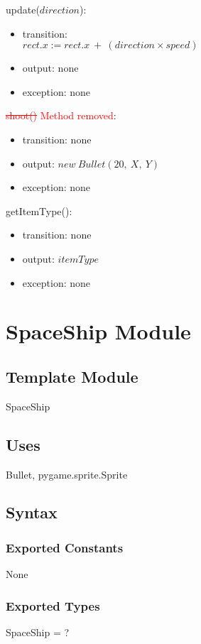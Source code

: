\documentclass[12pt]{article}
\begin{document}
\noindent update($direction$):
\begin{itemize}
\item transition: \\
$rect.x := rect.x\ +\ (direction \times speed)$
\item output: none
\item exception: none
\end{itemize}

\noindent \textcolor{red}{\st{shoot()} Method removed}:
\begin{itemize}
\item transition: none
\item output: $new\ Bullet(20,\ X,\ Y)$
\item exception: none
\end{itemize}

\noindent getItemType():
\begin{itemize}
\item transition: none
\item output: $itemType$
\item exception: none
\end{itemize}
\newpage

\section{SpaceShip Module}

\subsection*{Template Module}
SpaceShip

\subsection*{Uses}
Bullet, pygame.sprite.Sprite
\subsection*{Syntax}
\subsubsection*{Exported Constants}
None
\subsubsection*{Exported Types}
SpaceShip = ?
\end{document}
